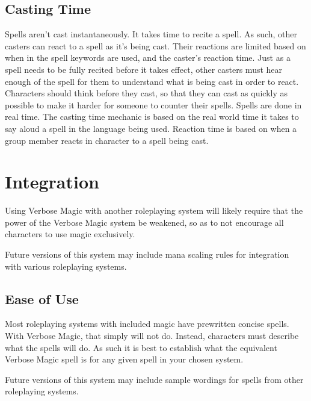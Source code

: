 \section{Casting Time}
Spells aren't cast instantaneously.
It takes time to recite a spell.
As such, other casters can react to a spell as it's being cast.
Their reactions are limited based on when in the spell keywords are used, and the caster's reaction time.
Just as a spell needs to be fully recited before it takes effect, other casters must hear enough of the spell for them to understand what is being cast in order to react.
Characters should think before they cast, so that they can cast as quickly as possible to make it harder for someone to counter their spells.
Spells are done in real time.
The casting time mechanic is based on the real world time it takes to say aloud a spell in the language being used.
Reaction time is based on when a group member reacts in character to a spell being cast.

\chapter{Integration}
Using Verbose Magic with another roleplaying system will likely require that the power of the Verbose Magic system be weakened, so as to not encourage all characters to use magic exclusively.

\begin{rpg-commentbox}
	Future versions of this system may include mana scaling rules for integration with various roleplaying systems.
\end{rpg-commentbox}

\section{Ease of Use}
Most roleplaying systems with included magic have prewritten concise spells.
With Verbose Magic, that simply will not do.
Instead, characters must describe what the spells will do.
As such it is best to establish what the equivalent Verbose Magic spell is for any given spell in your chosen system.

\begin{rpg-commentbox}
	Future versions of this system may include sample wordings for spells from other roleplaying systems.
\end{rpg-commentbox}

